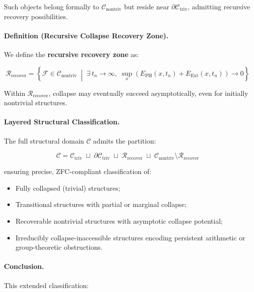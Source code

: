 \documentclass[11pt]{article}
\begin{document}
Such objects belong formally to $\mathcal{C}_{\mathrm{nontriv}}$ but reside near $\partial \mathcal{C}_{\mathrm{triv}}$, admitting recursive recovery possibilities.

\paragraph{Definition (Recursive Collapse Recovery Zone).}

We define the \textbf{recursive recovery zone} as:

\[
\mathcal{R}_{\mathrm{recover}} = \left\{ \mathcal{F} \in \mathcal{C}_{\mathrm{nontriv}} \;\middle|\; \exists \, t_n \to \infty, \; \sup_{x} \left( E_{\mathrm{PH}}(x,t_n) + E_{\mathrm{Ext}}(x,t_n) \right) \to 0 \right\}
\]

Within $\mathcal{R}_{\mathrm{recover}}$, collapse may eventually succeed asymptotically, even for initially nontrivial structures.

\paragraph{Layered Structural Classification.}

The full structural domain $\mathcal{C}$ admits the partition:

\[
\mathcal{C} = \mathcal{C}_{\mathrm{triv}} \;\sqcup\; \partial \mathcal{C}_{\mathrm{triv}} \;\sqcup\; \mathcal{R}_{\mathrm{recover}} \;\sqcup\; \mathcal{C}_{\mathrm{nontriv}} \setminus \mathcal{R}_{\mathrm{recover}}
\]

ensuring precise, ZFC-compliant classification of:

\begin{itemize}
    \item Fully collapsed (trivial) structures;
    \item Transitional structures with partial or marginal collapse;
    \item Recoverable nontrivial structures with asymptotic collapse potential;
    \item Irreducibly collapse-inaccessible structures encoding persistent arithmetic or group-theoretic obstructions.
\end{itemize}

\paragraph{Conclusion.}

This extended classification:
\end{document}
